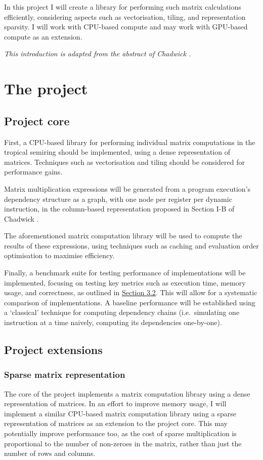 \documentclass[a4paper,12pt]{article}
\begin{document}

In this project I will create a library for performing such matrix
calculations efficiently, considering aspects such as vectorisation,
tiling, and representation sparsity. I will work with CPU-based compute
and may work with GPU-based compute as an extension.

\textit{This introduction is adapted from the abstract of Chadwick \cite{Chadderz}.}

\section{The project}

\subsection{Project core}
\label{sec:core}
First, a CPU-based library for performing individual matrix computations in the tropical
semiring should be implemented, using a dense representation of matrices.
Techniques such as vectorisation and tiling should be considered for performance gains.

Matrix multiplication expressions will be generated from a program execution's dependency
structure as a graph, with one node per register per dynamic instruction,
in the column-based representation proposed in Section I-B of Chadwick \cite{Chadderz}.

The aforementioned matrix computation library will be used to compute the results
of these expressions, using techniques such as caching and evaluation order optimisation
to maximise efficiency.

Finally, a benchmark suite for testing performance of implementations will be implemented,
focusing on testing key metrics such as execution time, memory usage, and correctness, as outlined
in \hyperref[sec:eval]{Section 3.2}. This will allow for a systematic comparison of implementations.
A baseline performance will be established using a \lq{classical\rq} technique for computing
dependency chains (i.e.~simulating one instruction at a time naively, computing its dependencies
one-by-one).

\subsection{Project extensions}
\label{sec:extensions}

\subsubsection{Sparse matrix representation}
The core of the project implements a matrix computation library using a dense
representation of matrices.
In an effort to improve memory usage, I will implement a similar CPU-based matrix computation
library using a sparse representation of matrices as an extension to the project core.
This may potentially improve performance too, as the cost of sparse multiplication is
proportional to the number of non-zeroes in the matrix, rather than just the number of rows
and columns.
\end{document}
